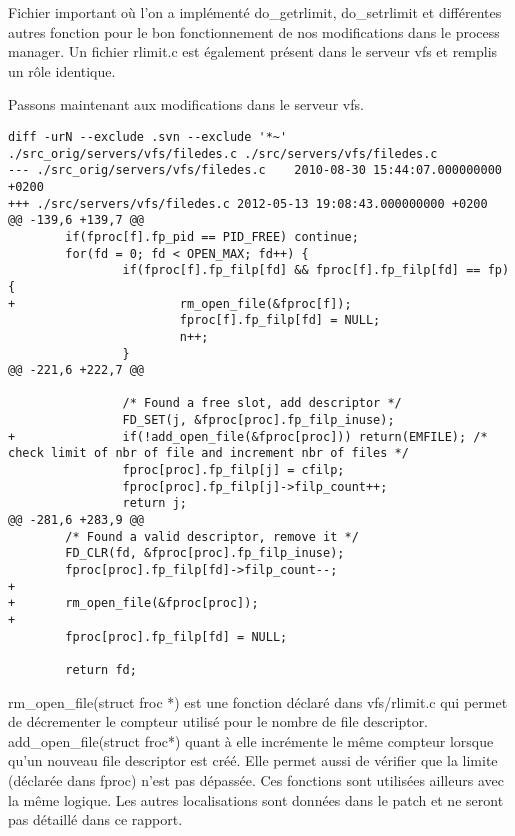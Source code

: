 \documentclass[9pt , a4paper]{report}
\begin{document}
Fichier important où l'on a implémenté do\_getrlimit, do\_setrlimit et différentes autres fonction pour le bon fonctionnement de nos modifications dans le process manager. Un fichier rlimit.c est également présent dans le serveur vfs et remplis un rôle identique.

Passons maintenant aux modifications dans le serveur vfs. 
\begin{lstlisting}
diff -urN --exclude .svn --exclude '*~' ./src_orig/servers/vfs/filedes.c ./src/servers/vfs/filedes.c
--- ./src_orig/servers/vfs/filedes.c    2010-08-30 15:44:07.000000000 +0200
+++ ./src/servers/vfs/filedes.c 2012-05-13 19:08:43.000000000 +0200
@@ -139,6 +139,7 @@
        if(fproc[f].fp_pid == PID_FREE) continue;
        for(fd = 0; fd < OPEN_MAX; fd++) {
                if(fproc[f].fp_filp[fd] && fproc[f].fp_filp[fd] == fp) {
+                       rm_open_file(&fproc[f]);
                        fproc[f].fp_filp[fd] = NULL;
                        n++;
                }
@@ -221,6 +222,7 @@

                /* Found a free slot, add descriptor */
                FD_SET(j, &fproc[proc].fp_filp_inuse);
+               if(!add_open_file(&fproc[proc])) return(EMFILE); /* check limit of nbr of file and increment nbr of files */
                fproc[proc].fp_filp[j] = cfilp;
                fproc[proc].fp_filp[j]->filp_count++;
                return j;
@@ -281,6 +283,9 @@
        /* Found a valid descriptor, remove it */
        FD_CLR(fd, &fproc[proc].fp_filp_inuse);
        fproc[proc].fp_filp[fd]->filp_count--;
+       
+       rm_open_file(&fproc[proc]);
+
        fproc[proc].fp_filp[fd] = NULL;

        return fd;
\end{lstlisting}

rm\_open\_file(struct froc *) est une fonction déclaré dans vfs/rlimit.c qui permet de décrementer le compteur utilisé pour le nombre de file descriptor. add\_open\_file(struct froc*) quant à elle incrémente le même compteur lorsque qu'un nouveau file descriptor est créé. Elle permet aussi de vérifier que la limite (déclarée dans fproc) n'est pas dépassée.
Ces fonctions sont utilisées ailleurs avec la même logique. Les autres localisations sont données dans le patch et ne seront pas détaillé dans ce rapport.
\end{document}
